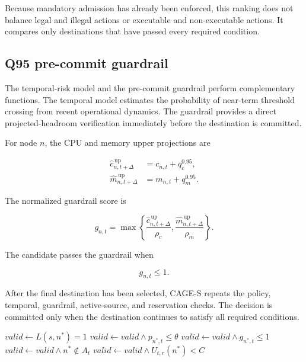Because mandatory admission has already been enforced, this ranking does
not balance legal and illegal actions or executable and non-executable
actions. It compares only destinations that have passed every required
condition.

\subsection{Q95 pre-commit guardrail}

The temporal-risk model and the pre-commit guardrail perform complementary
functions. The temporal model estimates the probability of near-term
threshold crossing from recent operational dynamics. The guardrail
provides a direct projected-headroom verification immediately before the
destination is committed.

For node $n$, the CPU and memory upper projections are

\begin{align}
\label{eq:method-cpu-upper}
    \widehat c^{\,\mathrm{up}}_{n,t+\Delta}
    &=
    c_{n,t}+q_c^{0.95},\\
\label{eq:method-memory-upper}
    \widehat m^{\,\mathrm{up}}_{n,t+\Delta}
    &=
    m_{n,t}+q_m^{0.95}.
\end{align}

The normalized guardrail score is

\begin{equation}
\label{eq:method-guardrail}
    g_{n,t}
    =
    \max
    \left\{
        \frac{
        \widehat c^{\,\mathrm{up}}_{n,t+\Delta}
        }{\rho_c},
        \frac{
        \widehat m^{\,\mathrm{up}}_{n,t+\Delta}
        }{\rho_m}
    \right\}.
\end{equation}

The candidate passes the guardrail when

\begin{equation}
\label{eq:method-guardrail-pass}
    g_{n,t}\leq1.
\end{equation}

After the final destination has been selected, CAGE-S repeats the policy,
temporal, guardrail, active-source, and reservation checks. The decision
is committed only when the destination continues to satisfy all required
conditions.

\begin{algorithm}[t]
\caption{Pre-commit destination verification}
\label{alg:precommit-verification}

$\textit{valid}\leftarrow
L(s,n^{*})=1$\;
$\textit{valid}\leftarrow
\textit{valid}\land
p_{n^{*},t}\leq\theta$\;
$\textit{valid}\leftarrow
\textit{valid}\land
g_{n^{*},t}\leq1$\;
$\textit{valid}\leftarrow
\textit{valid}\land
n^{*}\notin A_t$\;
$\textit{valid}\leftarrow
\textit{valid}\land
U_{t,r}(n^{*})<C$\;

\end{algorithm}

